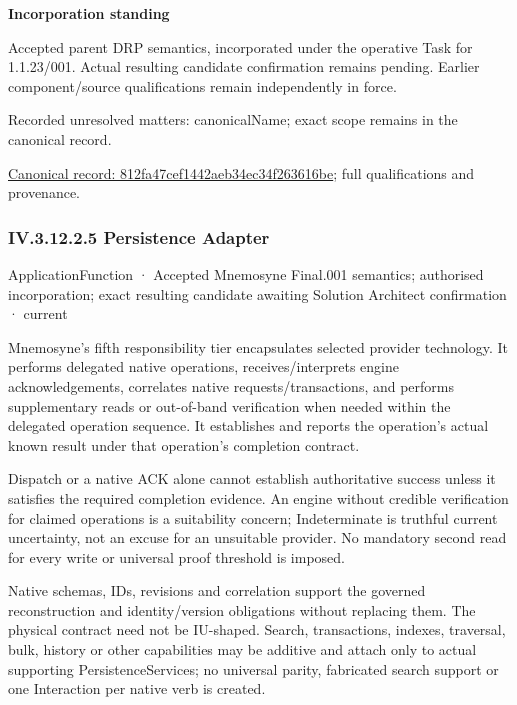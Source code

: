 \par\medskip\textbf{Incorporation standing}\par


Accepted parent DRP semantics, incorporated under the operative Task for 1.1.23/001. Actual resulting candidate confirmation remains pending. Earlier component/source qualifications remain independently in force.


{\small Recorded unresolved matters: canonicalName; exact scope remains in the canonical record.}\par
{\footnotesize \href{../../../../continuum/application/application-function/812fa47cef1442aeb34ec34f263616be.md}{Canonical record: 812fa47cef1442aeb34ec34f263616be}; full qualifications and provenance.}\par
\subsubsection*{IV.3.12.2.5 Persistence Adapter}
\label{navigation:IV.3.12.2.5}

\label{element:000f7241f12f411195b39fe8b8386e05}
{\small ApplicationFunction · Accepted Mnemosyne Final.001 semantics; authorised incorporation; exact resulting candidate awaiting Solution Architect confirmation · current}\par

Mnemosyne's fifth responsibility tier encapsulates selected provider technology. It performs delegated native operations, receives/interprets engine acknowledgements, correlates native requests/transactions, and performs supplementary reads or out-of-band verification when needed within the delegated operation sequence. It establishes and reports the operation's actual known result under that operation's completion contract.



Dispatch or a native ACK alone cannot establish authoritative success unless it satisfies the required completion evidence. An engine without credible verification for claimed operations is a suitability concern; Indeterminate is truthful current uncertainty, not an excuse for an unsuitable provider. No mandatory second read for every write or universal proof threshold is imposed.



Native schemas, IDs, revisions and correlation support the governed reconstruction and identity/version obligations without replacing them. The physical contract need not be IU-shaped. Search, transactions, indexes, traversal, bulk, history or other capabilities may be additive and attach only to actual supporting PersistenceServices; no universal parity, fabricated search support or one Interaction per native verb is created.



